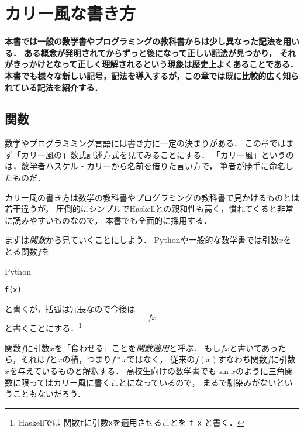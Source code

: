 \documentclass[a5paper,draft]{jsbook}
\newcommand{\programminglanguage}[1]{\textsf{#1}}
\newcommand{\haskell}{\programminglanguage{Haskell}}
\newcommand{\python}{\programminglanguage{Python}}
\newenvironment{leader}{\begingroup\bf}{\endgroup}
\newcommand{\keyword}[1]{{\underline{\emph{#1}}}}
\newcommand{\code}[1]{\texttt{#1}}
\newenvironment{pythoncode}{\begin{itembox}[r]{\python}}{\end{itembox}}
\newcommand{\pthnId}[1]{\textit{#1}}
\begin{document}
\chapter{カリー風な書き方}

\begin{leader}
本書では一般の数学書やプログラミングの教科書からは少し異なった記法を用いる．
ある概念が発明されてからずっと後になって正しい記法が見つかり，
それがきっかけとなって正しく理解されるという現象は歴史上よくあることである．
本書でも様々な新しい記号，記法を導入するが，この章では既に比較的広く知られている記法を紹介する．
\end{leader}

\section{関数}

数学やプログラミミング言語には書き方に一定の決まりがある．
この章ではまず「カリー風の」数式記述方式を見てみることにする．
「カリー風」というのは，数学者ハスケル・カリーから名前を借りた言い方で，
筆者が勝手に命名したものだ．

カリー風の書き方は数学の教科書やプログラミングの教科書で見かけるものとは若干違うが，
圧倒的にシンプルで\haskell との親和性も高く，慣れてくると非常に読みやすいものなので，
本書でも全面的に採用する．

まずは\keyword{関数}から見ていくことにしよう．
\python や一般的な数学書では引数$x$をとる関数$f$を
\begin{pythoncode}
\begin{verbatim}
f(x)
\end{verbatim}
\end{pythoncode}
と書くが，括弧は冗長なので今後は
\begin{equation}
fx
\end{equation}
と書くことにする．\footnote{\haskell では
関数\code{f}に引数\code{x}を適用させることを \code{f x} と書く．}


関数$f$に引数$x$を「食わせる」ことを\keyword{関数適用}と呼ぶ．
もし$fx$と書いてあったら，それは$f$と$x$の積，つまり$f*x$ではなく，
従来の$f\left(x\right)$すなわち関数$f$に引数$x$を与えているものと解釈する．
高校生向けの数学書でも$\sin x$のように三角関数に限ってはカリー風に書くことになっているので，
まるで馴染みがないということもないだろう．
\end{document}
